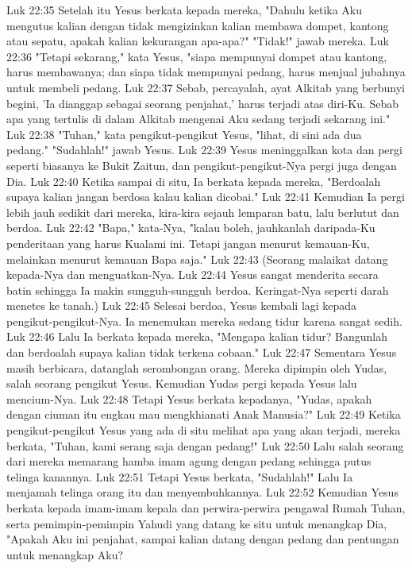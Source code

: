 Luk 22:35  Setelah itu Yesus berkata kepada mereka, "Dahulu ketika Aku mengutus kalian dengan tidak mengizinkan kalian membawa dompet, kantong atau sepatu, apakah kalian kekurangan apa-apa?" "Tidak!" jawab mereka.
Luk 22:36  "Tetapi sekarang," kata Yesus, "siapa mempunyai dompet atau kantong, harus membawanya; dan siapa tidak mempunyai pedang, harus menjual jubahnya untuk membeli pedang.
Luk 22:37  Sebab, percayalah, ayat Alkitab yang berbunyi begini, 'Ia dianggap sebagai seorang penjahat,' harus terjadi atas diri-Ku. Sebab apa yang tertulis di dalam Alkitab mengenai Aku sedang terjadi sekarang ini."
Luk 22:38  "Tuhan," kata pengikut-pengikut Yesus, "lihat, di sini ada dua pedang." "Sudahlah!" jawab Yesus.
Luk 22:39  Yesus meninggalkan kota dan pergi seperti biasanya ke Bukit Zaitun, dan pengikut-pengikut-Nya pergi juga dengan Dia.
Luk 22:40  Ketika sampai di situ, Ia berkata kepada mereka, "Berdoalah supaya kalian jangan berdosa kalau kalian dicobai."
Luk 22:41  Kemudian Ia pergi lebih jauh sedikit dari mereka, kira-kira sejauh lemparan batu, lalu berlutut dan berdoa.
Luk 22:42  "Bapa," kata-Nya, "kalau boleh, jauhkanlah daripada-Ku penderitaan yang harus Kualami ini. Tetapi jangan menurut kemauan-Ku, melainkan menurut kemauan Bapa saja."
Luk 22:43  (Seorang malaikat datang kepada-Nya dan menguatkan-Nya.
Luk 22:44  Yesus sangat menderita secara batin sehingga Ia makin sungguh-sungguh berdoa. Keringat-Nya seperti darah menetes ke tanah.)
Luk 22:45  Selesai berdoa, Yesus kembali lagi kepada pengikut-pengikut-Nya. Ia menemukan mereka sedang tidur karena sangat sedih.
Luk 22:46  Lalu Ia berkata kepada mereka, "Mengapa kalian tidur? Bangunlah dan berdoalah supaya kalian tidak terkena cobaan."
Luk 22:47  Sementara Yesus masih berbicara, datanglah serombongan orang. Mereka dipimpin oleh Yudas, salah seorang pengikut Yesus. Kemudian Yudas pergi kepada Yesus lalu mencium-Nya.
Luk 22:48  Tetapi Yesus berkata kepadanya, "Yudas, apakah dengan ciuman itu engkau mau mengkhianati Anak Manusia?"
Luk 22:49  Ketika pengikut-pengikut Yesus yang ada di situ melihat apa yang akan terjadi, mereka berkata, "Tuhan, kami serang saja dengan pedang!"
Luk 22:50  Lalu salah seorang dari mereka memarang hamba imam agung dengan pedang sehingga putus telinga kanannya.
Luk 22:51  Tetapi Yesus berkata, "Sudahlah!" Lalu Ia menjamah telinga orang itu dan menyembuhkannya.
Luk 22:52  Kemudian Yesus berkata kepada imam-imam kepala dan perwira-perwira pengawal Rumah Tuhan, serta pemimpin-pemimpin Yahudi yang datang ke situ untuk menangkap Dia, "Apakah Aku ini penjahat, sampai kalian datang dengan pedang dan pentungan untuk menangkap Aku?
